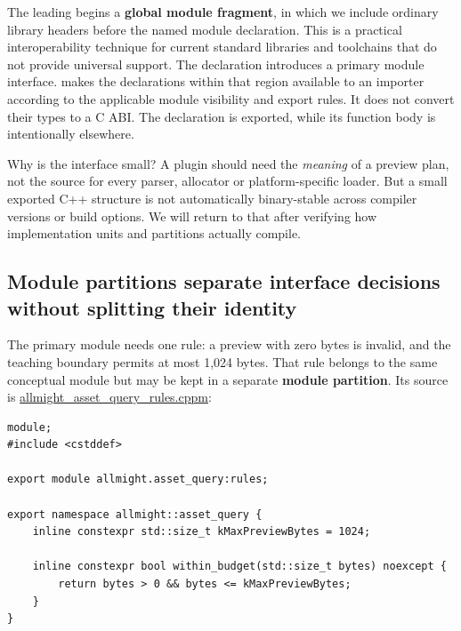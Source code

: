 The leading  begins a \textbf{global module fragment}, in which we include ordinary library headers before the named module declaration. This is a practical interoperability technique for current standard libraries and toolchains that do not provide universal  support. The  declaration introduces a primary module interface.  makes the declarations within that region available to an importer according to the applicable module visibility and export rules. It does not convert their types to a C ABI. The  declaration is exported, while its function body is intentionally elsewhere.

Why is the interface small? A plugin should need the \emph{meaning} of a preview plan, not the source for every parser, allocator or platform-specific loader. But a small exported C++ structure is not automatically binary-stable across compiler versions or build options. We will return to that after verifying how implementation units and partitions actually compile.

\subsection{Module partitions separate interface decisions without splitting their identity}\label{01-foundations-i-ch006-module-partitions-separate-interface-decisions-without-splitting-their-identity}

\hypertarget{01-foundations-i-ch006-module-partitions-separate-interface-decisions-without-splitting-their-identity}{}

The primary module needs one rule: a preview with zero bytes is invalid, and the teaching boundary permits at most 1,024 bytes. That rule belongs to the same conceptual module but may be kept in a separate \textbf{module partition}. Its source is \hyperref[source-file-b84757ff09b490e82f7f98ea]{allmight\_asset\_query\_rules.cppm}:

\begin{verbatim}
module;
#include <cstddef>

export module allmight.asset_query:rules;

export namespace allmight::asset_query {
    inline constexpr std::size_t kMaxPreviewBytes = 1024;

    inline constexpr bool within_budget(std::size_t bytes) noexcept {
        return bytes > 0 && bytes <= kMaxPreviewBytes;
    }
}
\end{verbatim}


